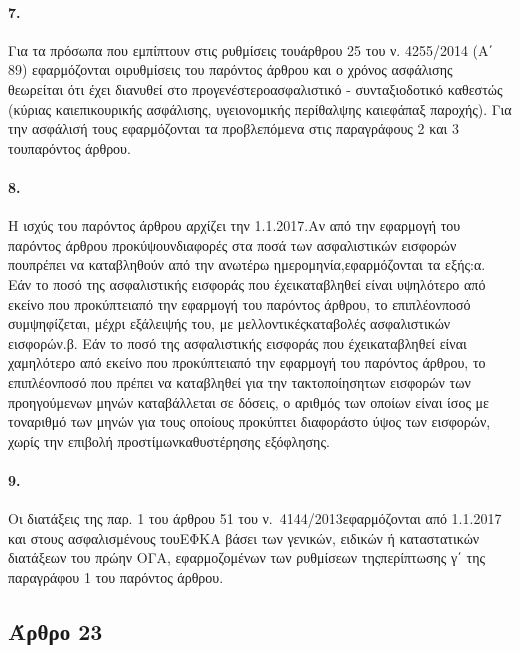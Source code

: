 \documentclass[a4paper,oneside, 10pt]{book}
\begin{document}
\paragraph { 7. } Για τα πρόσωπα που εμπίπτουν στις ρυθμίσεις τουάρθρου 25 του ν. 4255/2014 (Α΄ 89) εφαρμόζονται οιρυθμίσεις του παρόντος άρθρου και ο χρόνος ασφάλισης θεωρείται ότι έχει διανυθεί στο προγενέστεροασφαλιστικό - συνταξιοδοτικό καθεστώς (κύριας καιεπικουρικής ασφάλισης, υγειονομικής περίθαλψης καιεφάπαξ παροχής). Για την ασφάλισή τους εφαρμόζονται τα προβλεπόμενα στις παραγράφους 2 και 3 τουπαρόντος άρθρου.
\paragraph { 8. } Η ισχύς του παρόντος άρθρου αρχίζει την 1.1.2017.Αν από την εφαρμογή του παρόντος άρθρου προκύψουνδιαφορές στα ποσά των ασφαλιστικών εισφορών πουπρέπει να καταβληθούν από την ανωτέρω ημερομηνία,εφαρμόζονται τα εξής:α. Εάν το ποσό της ασφαλιστικής εισφοράς που έχεικαταβληθεί είναι υψηλότερο από εκείνο που προκύπτειαπό την εφαρμογή του παρόντος άρθρου, το επιπλέονποσό συμψηφίζεται, μέχρι εξάλειψής του, με μελλοντικέςκαταβολές ασφαλιστικών εισφορών.β. Εάν το ποσό της ασφαλιστικής εισφοράς που έχεικαταβληθεί είναι χαμηλότερο από εκείνο που προκύπτειαπό την εφαρμογή του παρόντος άρθρου, το επιπλέονποσό που πρέπει να καταβληθεί για την τακτοποίησητων εισφορών των προηγούμενων μηνών καταβάλλεται σε δόσεις, ο αριθμός των οποίων είναι ίσος με τοναριθμό των μηνών για τους οποίους προκύπτει διαφοράστο ύψος των εισφορών, χωρίς την επιβολή προστίμωνκαθυστέρησης εξόφλησης.
\paragraph { 9. } Οι διατάξεις της παρ. 1 του άρθρου 51 του ν. 4144/2013εφαρμόζονται από 1.1.2017 και στους ασφαλισμένους τουΕΦΚΑ βάσει των γενικών, ειδικών ή καταστατικών διατάξεων του πρώην ΟΓΑ, εφαρμοζομένων των ρυθμίσεων τηςπερίπτωσης γ΄ της παραγράφου 1 του παρόντος άρθρου.
\subsection*{ Άρθρο 23 }
\end{document}
